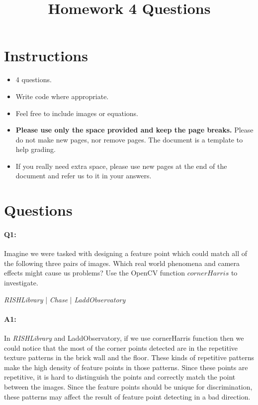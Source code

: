 \date{}

\title{\vspace{-1cm}Homework 4 Questions}



\maketitle
\vspace{-3cm}
\thispagestyle{fancy}

\section*{Instructions}
\begin{itemize}
  \item 4 questions.
  \item Write code where appropriate.
  \item Feel free to include images or equations.
  \item \textbf{Please use only the space provided and keep the page breaks.} Please do not make new pages, nor remove pages. The document is a template to help grading.
  \item If you really need extra space, please use new pages at the end of the document and refer us to it in your answers.
\end{itemize}

\section*{Questions}

\paragraph{Q1:} Imagine we were tasked with designing a feature point which could match all of the following three pairs of images. Which real world phenomena and camera effects might cause us problems?
Use the OpenCV function $cornerHarris$ to investigate.

\emph{RISHLibrary} | \emph{Chase} | \emph{LaddObservatory}

\paragraph{A1:} 
In \emph{RISHLibrary} and {LaddObservatory}, if we use cornerHarris function then we could notice that the most of the corner points detected are in the repetitive texture patterns in the brick wall and the floor. These kinds of repetitive patterns make the high density of feature points in those patterns. Since these points are repetitive, it is hard to distinguish the points and correctly match the point between the images. Since the feature points should be unique for discrimination, these patterns may affect the result of feature point detecting in a bad direction.

